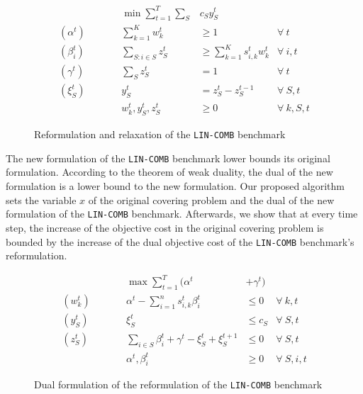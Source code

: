 \begin{figure}[ht]
    \begin{mdframed}
        \vspace{-8pt}
        \begin{align*}
            && \min \sum_{t = 1}^{T} \sum_{S} & c_S y_S^t \\
            (\alpha^{t}) \qquad && \sum_{k=1}^{K} w_{k}^{t} & \geq 1  & \forall\ t \\
            (\beta_{i}^{t}) \qquad && \sum_{S: i \in S} z_{S}^{t} &\ge \sum_{k=1}^{K} s_{i,k}^{t} w_{k}^{t}   &\forall\ i,t\\
            (\gamma^{t}) \qquad && \sum_{S} z_{S}^{t} &= 1   &\forall\ t\\
            (\xi_{S}^{t}) \qquad && y_{S}^{t} &= z_{S}^{t} - z_{S}^{t-1}   &\forall\ S,t\\
            && w_{k}^{t}, y_{S}^{t}, z_{S}^{t} & \ge 0 & \forall\ k,S,t
        \end{align*}
    \end{mdframed}
    \caption{Reformulation and relaxation of the \texttt{LIN-COMB} benchmark}
    \label{fig:reformulation}
\end{figure}

The new formulation of the \texttt{LIN-COMB} benchmark lower bounds its original formulation. According to the theorem of weak duality, the dual of the new formulation is a lower bound to the new formulation. Our proposed algorithm sets the variable $x$ of the original covering problem and the dual of the new formulation of the \texttt{LIN-COMB} benchmark. Afterwards, we show that at every time step, the increase of the objective cost in the original covering problem is bounded by the increase of the dual objective cost of the \texttt{LIN-COMB} benchmark's reformulation.

\clearpage

\begin{figure}[ht]
    \begin{mdframed}
        \vspace{-8pt}
        \begin{align*}
            && \max \sum_{t=1}^{T}  (\alpha^{t} &+ \gamma^{t}) \\
            (w_{k}^{t}) \qquad && \alpha^{t} - \sum_{i=1}^{n} s_{i,k}^{t} \beta_{i}^{t} &\leq 0  &\forall\ k,t\\
            (y_{S}^{t}) \qquad && \xi_{S}^{t}   &\leq c_{S}  &\forall\ S,t \\
            (z_{S}^{t}) \qquad && \sum_{i \in S}\beta_{i}^{t} + \gamma^{t} - \xi_{S}^{t} + \xi_{S}^{t+1}  &\leq 0  &\forall\ S,t \\
            && \alpha^{t}, \beta_{i}^{t} & \ge 0 & \forall\ S,i,t
        \end{align*}
    \end{mdframed}
    \caption{Dual formulation of the reformulation of the \texttt{LIN-COMB} benchmark}
    \label{fig:ref-dual}
\end{figure}


